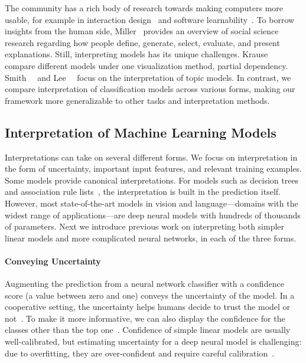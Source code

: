 The  community has a rich body of research towards making
computers more usable, for example in interaction
design~\cite{ju2008design} and software
learnability~\cite{grossman2009survey}.
To borrow insights from the human side,
Miller~\cite{miller2017explanation} provides an overview of social
science research regarding how people define, generate, select,
evaluate, and present explanations.
Still, interpreting  models has its unique challenges.
Krause~\etal{}~\cite{krause2016interacting} compare different 
models under one visualization method, partial dependency.
Smith~\etal{}~\cite{smith2017evaluating} and
Lee~\etal{}~\cite{lee2017human} focus on the
interpretation of topic models. In contrast, we compare interpretation
of classification models across various forms, making
our framework more generalizable to other tasks and interpretation
methods.

\subsection{Interpretation of Machine Learning Models}

Interpretations can take on several different forms.
We focus on interpretation in the form of uncertainty, important
input features, and relevant training examples.  Some  models
provide canonical interpretations.
For models such as
decision trees and association rule
lists~\cite{lakkaraju2016interpretable, letham2015interpretable}, the
interpretation is built in the prediction itself.  However, most
state-of-the-art models in vision and language---domains with the
widest range of applications---are deep neural models with hundreds of
thousands of parameters. Next we introduce previous work on
interpreting both simpler linear models and more complicated neural
networks, in each of the three forms.

\paragraph{Conveying Uncertainty}
Augmenting the prediction from a neural network classifier with a
confidence score (a value between zero and one) conveys the
uncertainty of the model. In a cooperative setting, the uncertainty
helps humans decide to trust the model or
not~\cite{antifakos2005towards, rukzio2006visualization}. To make it
more informative, we can also display the confidence for the
classes other than the top one~\cite{liu2017towards}.
Confidence of simple linear models are usually
well-calibrated, but estimating uncertainty for a deep neural model
is challenging: due to overfitting, they are over-confident 
and require careful calibration~\cite{guo2017calibration,
feng2018rawr}.


